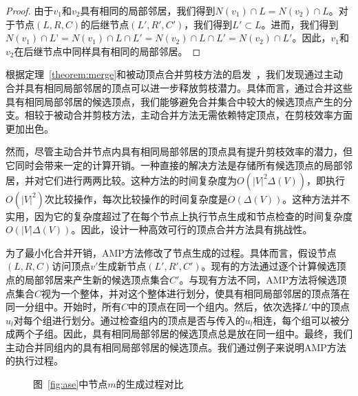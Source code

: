 \begin{proof}
  由于$v_1$和$v_2$具有相同的局部邻居，我们得到$N(v_1)\cap L = N(v_2)\cap L$。对于节点$(L,R,C)$的后继节点$(L',R',C')$，我们得到$L' \subset L$。进而，我们得到$N(v_1)\cap L’ = N(v_1) \cap L \cap L' = N(v_2) \cap L \cap L' = N(v_2)\cap L'$。因此，$v_1$和$v_2$在后继节点中同样具有相同的局部邻居。
\end{proof}


根据定理~\ref{theorem:merge}和被动顶点合并剪枝方法的启发~\cite{iMBEA14}，我们发现通过主动合并具有相同局部邻居的顶点可以进一步释放剪枝潜力。具体而言，通过合并这些具有相同局部邻居的候选顶点，我们能够避免合并集合中较大的候选顶点产生的分支。相较于被动合并剪枝方法，主动合并方法无需依赖特定顶点，在剪枝效率方面更加出色。

然而，尽管主动合并节点内具有相同局部邻居的顶点具有提升剪枝效率的潜力，但它同时会带来一定的计算开销。一种直接的解决方法是存储所有候选顶点的局部邻居，并对它们进行两两比较。这种方法的时间复杂度为$O(|V|^2\Delta(V))$，即执行$O(|V|^2)$次比较操作，每次比较操作的时间复杂度是$O(\Delta(V))$。这种方法并不实用，因为它的复杂度超过了在每个节点上执行节点生成和节点检查的时间复杂度$O(|V|\Delta(V))$。因此，设计一种高效可行的顶点合并方法具有挑战性。

为了最小化合并开销，AMP方法修改了节点生成的过程。具体而言，假设节点$(L,R,C)$访问顶点$v'$生成新节点$(L',R',C')$。现有的方法通过逐个计算候选顶点的局部邻居来产生新的候选顶点集合$C'$。与现有方法不同，AMP方法将候选顶点集合$C$视为一个整体，并对这个整体进行划分，使具有相同局部邻居的顶点落在同一分组中。开始时，所有$C$中的顶点在同一个组内。然后，依次选择$L'$中的顶点$u_l$对每个组进行划分。通过检查组内的顶点是否与传入的$u_l$相连，每个组可以被分成两个子组。因此，具有相同局部邻居的候选顶点总是放在同一组中。最终，我们主动合并同组内的具有相同局部邻居的候选顶点。我们通过例子来说明AMP方法的执行过程。


\begin{figure} 
	\centering
	
	 \quad

	\caption{图~\ref{fig:ase}中节点$m$的生成过程对比}
	\label{fig:amp}

\end{figure}

